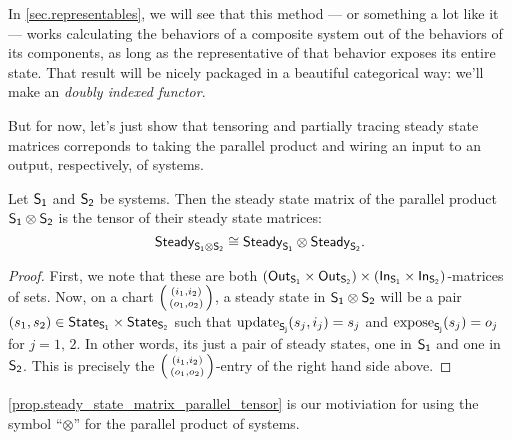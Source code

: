 \documentclass[DynamicalBook]{subfiles}
\begin{document}
In \cref{sec.representables}, we will see that this method --- or something a
lot like it --- works calculating the behaviors of a composite system out of the
behaviors of its components, as long as the representative of that behavior
exposes its entire state. That result will be nicely packaged in a beautiful
categorical way: we'll make an \emph{doubly indexed functor}.

But for now, let's just show that tensoring and partially tracing steady state
matrices correponds to taking the parallel product and wiring an input to an
output, respectively, of systems.

\begin{proposition}\label{prop.steady_state_matrix_parallel_tensor}
  Let $\mathsf{S_1}$ and $\mathsf{S_2}$ be systems. Then the steady state matrix of the
  parallel product $\mathsf{S_1 \otimes S_2}$ is the tensor of their steady state
  matrices:
  $$\mathsf{Steady}_{\mathsf{S_1 \otimes S_2}} \cong \mathsf{Steady}_{\mathsf{S_1}} \otimes \mathsf{Steady}_{\mathsf{S_2}}.$$
\end{proposition}
\begin{proof}
  First, we note that these are both $(\mathsf{Out}_{\mathsf{S_1}} \times \mathsf{Out}_{\mathsf{S_2}}) \times
  (\mathsf{In}_{\mathsf{S_1}} \times \mathsf{In}_{\mathsf{S_2}})$-matrices of sets. Now, on a chart $\lens{(i_1,
    i_2)}{(o_1, o_2)}$, a steady state in $\mathsf{S_1} \otimes \mathsf{S_2}$ will be
  a pair $(s_1, s_2) \in \mathsf{State}_{\mathsf{S_1}} \times \mathsf{State}_{\mathsf{S_2}}$ such that
  $\mathrm{update}_{\mathsf{S_j}}(s_j, i_j) = s_j$ and $\mathrm{expose}_{\mathsf{S_j}}(s_j) = o_j$ for $j = 1,\, 2$.
  In other words, its just a pair of steady states, one in $\mathsf{S_1}$ and one
  in $\mathsf{S_2}$. This is precisely the $\lens{(i_1, i_2)}{(o_1, o_2) }$-entry
  of the right hand side above. 
\end{proof}


\begin{remark}
  \cref{prop.steady_state_matrix_parallel_tensor} is our motiviation for using
  the symbol ``$\otimes$'' for the parallel product of systems.
\end{remark}
\end{document}
